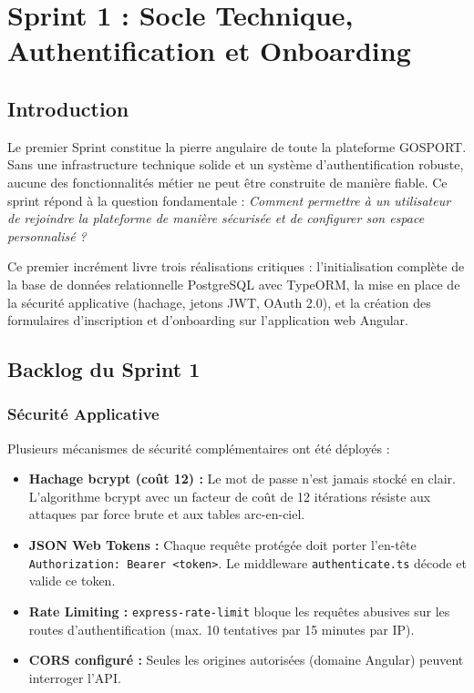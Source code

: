 \chapter{Sprint 1 : Socle Technique, Authentification et Onboarding}
\minitoc
\newpage

\section{Introduction}
Le premier Sprint constitue la pierre angulaire de toute la plateforme GOSPORT. Sans une infrastructure technique solide et un système d'authentification robuste, aucune des fonctionnalités métier ne peut être construite de manière fiable. Ce sprint répond à la question fondamentale : \textit{Comment permettre à un utilisateur de rejoindre la plateforme de manière sécurisée et de configurer son espace personnalisé ?}

Ce premier incrément livre trois réalisations critiques : l'initialisation complète de la base de données relationnelle PostgreSQL avec TypeORM, la mise en place de la sécurité applicative (hachage, jetons JWT, OAuth 2.0), et la création des formulaires d'inscription et d'onboarding sur l'application web Angular.

\section{Backlog du Sprint 1}


\subsection{Sécurité Applicative}
Plusieurs mécanismes de sécurité complémentaires ont été déployés :
\begin{itemize}
    \item \textbf{Hachage bcrypt (coût 12) :} Le mot de passe n'est jamais stocké en clair. L'algorithme bcrypt avec un facteur de coût de 12 itérations résiste aux attaques par force brute et aux tables arc-en-ciel.
    \item \textbf{JSON Web Tokens :} Chaque requête protégée doit porter l'en-tête \texttt{Authorization: Bearer <token>}. Le middleware \texttt{authenticate.ts} décode et valide ce token.
    \item \textbf{Rate Limiting :} \texttt{express-rate-limit} bloque les requêtes abusives sur les routes d'authentification (max. 10 tentatives par 15 minutes par IP).
    \item \textbf{CORS configuré :} Seules les origines autorisées (domaine Angular) peuvent interroger l'API.
\end{itemize}

